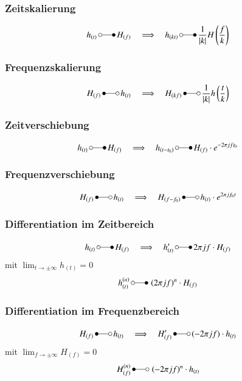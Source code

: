 \subsubsection{Zeitskalierung}
\begin{equation}
	h_{(t)} \,\laplace\, H_{(f)}\quad\Longrightarrow\quad h_{(kt)} \,\laplace\, \frac{1}{|k|} H\left(\frac{f}{k}\right)
\end{equation}

\subsubsection{Frequenzskalierung}
\begin{equation}
	H_{(f)} \,\Laplace\, h_{(t)}\quad\Longrightarrow\quad H_{(kf)} \,\Laplace\, \frac{1}{|k|} h\left(\frac{t}{k}\right)
\end{equation}

\subsubsection{Zeitverschiebung}
\begin{equation}
	h_{(t)} \,\laplace\, H_{(f)}\quad\Longrightarrow\quad h_{(t-t_0)} \,\laplace\, H_{(f)}\cdot e^{-2\pi jft_0}
\end{equation}

\subsubsection{Frequenzverschiebung}
\begin{equation}
	H_{(f)} \,\Laplace\, h_{(t)}\quad\Longrightarrow\quad H_{(f-f_0)} \,\Laplace\, h_{(t)}\cdot e^{2\pi jf_0t}
\end{equation}

\subsubsection{Differentiation im Zeitbereich}
\begin{equation}
	h_{(t)} \,\laplace\, H_{(f)}\quad\Longrightarrow\quad h'_{(t)} \,\laplace\, 2\pi jf\cdot H_{(f)}
\end{equation}
mit $\lim_{t\rightarrow\pm\infty}h_{(t)} = 0$
\begin{equation}
	h^{(n)}_{(t)} \,\laplace\, \left(2\pi jf\right)^n\cdot H_{(f)}
\end{equation}

\subsubsection{Differentiation im Frequenzbereich}
\begin{equation}
	H_{(f)} \,\Laplace\, h_{(t)}\quad\Longrightarrow\quad H'_{(f)} \,\Laplace\, (-2\pi jf)\cdot h_{(t)}
\end{equation}
mit $\lim_{f\rightarrow\pm\infty}H_{(f)} = 0$
\begin{equation}
	H^{(n)}_{(f)} \,\Laplace\, \left(-2\pi jf\right)^n\cdot h_{(t)}
\end{equation}


